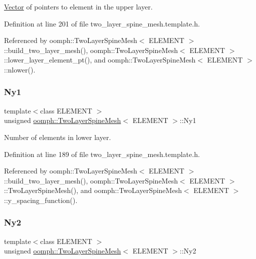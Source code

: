 \hyperlink{classoomph_1_1Vector}{Vector} of pointers to element in the upper layer. 



Definition at line 201 of file two\+\_\+layer\+\_\+spine\+\_\+mesh.\+template.\+h.



Referenced by oomph\+::\+Two\+Layer\+Spine\+Mesh$<$ E\+L\+E\+M\+E\+N\+T $>$\+::build\+\_\+two\+\_\+layer\+\_\+mesh(), oomph\+::\+Two\+Layer\+Spine\+Mesh$<$ E\+L\+E\+M\+E\+N\+T $>$\+::lower\+\_\+layer\+\_\+element\+\_\+pt(), and oomph\+::\+Two\+Layer\+Spine\+Mesh$<$ E\+L\+E\+M\+E\+N\+T $>$\+::nlower().

\mbox{\label{classoomph_1_1TwoLayerSpineMesh_a614e800b8c5ba2963254e7e41bcfc9e2}} 
\subsubsection{\texorpdfstring{Ny1}{Ny1}}
{\footnotesize\ttfamily template$<$class E\+L\+E\+M\+E\+NT $>$ \\
unsigned \hyperlink{classoomph_1_1TwoLayerSpineMesh}{oomph\+::\+Two\+Layer\+Spine\+Mesh}$<$ E\+L\+E\+M\+E\+NT $>$\+::Ny1\hspace{0.3cm}{\ttfamily [protected]}}



Number of elements in lower layer. 



Definition at line 189 of file two\+\_\+layer\+\_\+spine\+\_\+mesh.\+template.\+h.



Referenced by oomph\+::\+Two\+Layer\+Spine\+Mesh$<$ E\+L\+E\+M\+E\+N\+T $>$\+::build\+\_\+two\+\_\+layer\+\_\+mesh(), oomph\+::\+Two\+Layer\+Spine\+Mesh$<$ E\+L\+E\+M\+E\+N\+T $>$\+::\+Two\+Layer\+Spine\+Mesh(), and oomph\+::\+Two\+Layer\+Spine\+Mesh$<$ E\+L\+E\+M\+E\+N\+T $>$\+::y\+\_\+spacing\+\_\+function().

\mbox{\label{classoomph_1_1TwoLayerSpineMesh_a48a69edc318571675eed16c9154235e3}} 
\subsubsection{\texorpdfstring{Ny2}{Ny2}}
{\footnotesize\ttfamily template$<$class E\+L\+E\+M\+E\+NT $>$ \\
unsigned \hyperlink{classoomph_1_1TwoLayerSpineMesh}{oomph\+::\+Two\+Layer\+Spine\+Mesh}$<$ E\+L\+E\+M\+E\+NT $>$\+::Ny2\hspace{0.3cm}{\ttfamily [protected]}}



